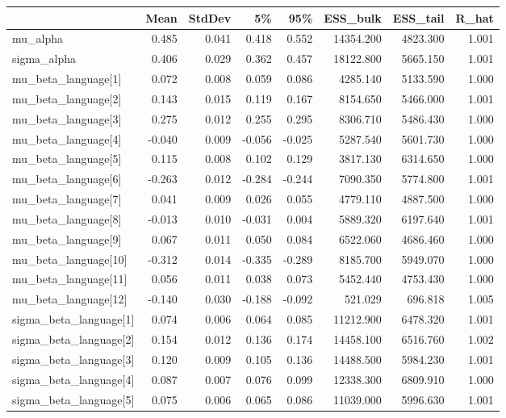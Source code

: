 \begin{tabular}{lrrrrrrr}
\toprule
 & Mean & StdDev & 5\% & 95\% & ESS\_bulk & ESS\_tail & R\_hat \\
\midrule
mu\_alpha & 0.485 & 0.041 & 0.418 & 0.552 & 14354.200 & 4823.300 & 1.001 \\
sigma\_alpha & 0.406 & 0.029 & 0.362 & 0.457 & 18122.800 & 5665.150 & 1.001 \\
mu\_beta\_language[1] & 0.072 & 0.008 & 0.059 & 0.086 & 4285.140 & 5133.590 & 1.000 \\
mu\_beta\_language[2] & 0.143 & 0.015 & 0.119 & 0.167 & 8154.650 & 5466.000 & 1.001 \\
mu\_beta\_language[3] & 0.275 & 0.012 & 0.255 & 0.295 & 8306.710 & 5486.430 & 1.000 \\
mu\_beta\_language[4] & -0.040 & 0.009 & -0.056 & -0.025 & 5287.540 & 5601.730 & 1.000 \\
mu\_beta\_language[5] & 0.115 & 0.008 & 0.102 & 0.129 & 3817.130 & 6314.650 & 1.000 \\
mu\_beta\_language[6] & -0.263 & 0.012 & -0.284 & -0.244 & 7090.350 & 5774.800 & 1.001 \\
mu\_beta\_language[7] & 0.041 & 0.009 & 0.026 & 0.055 & 4779.110 & 4887.500 & 1.000 \\
mu\_beta\_language[8] & -0.013 & 0.010 & -0.031 & 0.004 & 5889.320 & 6197.640 & 1.001 \\
mu\_beta\_language[9] & 0.067 & 0.011 & 0.050 & 0.084 & 6522.060 & 4686.460 & 1.000 \\
mu\_beta\_language[10] & -0.312 & 0.014 & -0.335 & -0.289 & 8185.700 & 5949.070 & 1.000 \\
mu\_beta\_language[11] & 0.056 & 0.011 & 0.038 & 0.073 & 5452.440 & 4753.430 & 1.000 \\
mu\_beta\_language[12] & -0.140 & 0.030 & -0.188 & -0.092 & 521.029 & 696.818 & 1.005 \\
sigma\_beta\_language[1] & 0.074 & 0.006 & 0.064 & 0.085 & 11212.900 & 6478.320 & 1.001 \\
sigma\_beta\_language[2] & 0.154 & 0.012 & 0.136 & 0.174 & 14458.100 & 6516.760 & 1.002 \\
sigma\_beta\_language[3] & 0.120 & 0.009 & 0.105 & 0.136 & 14488.500 & 5984.230 & 1.001 \\
sigma\_beta\_language[4] & 0.087 & 0.007 & 0.076 & 0.099 & 12338.300 & 6809.910 & 1.000 \\
sigma\_beta\_language[5] & 0.075 & 0.006 & 0.065 & 0.086 & 11039.000 & 5996.630 & 1.001 \\

\end{tabular}
